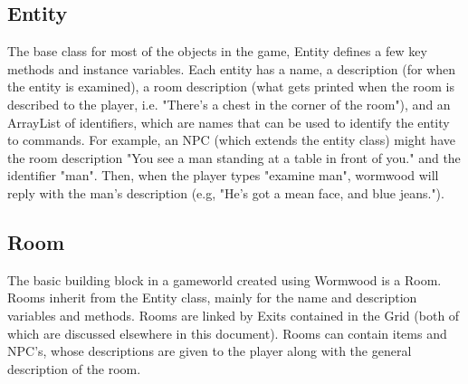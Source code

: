 \documentclass[12pt]{report}
\begin{document}
\subsection{Entity}
The base class for most of the objects in the game, Entity defines a few key methods and instance variables. Each entity has a name, a description (for when the entity is examined), a room description (what gets printed when the room is described to the player, i.e. "There's a chest in the corner of the room"), and an ArrayList of identifiers, which are names that can be used to identify the entity to commands. For example, an NPC (which extends the entity class) might have the room description "You see a man standing at a table in front of you." and the identifier "man". Then, when the player types "examine man", wormwood will reply with the man's description (e.g, "He's got a mean face, and blue jeans.").

\subsection{Room}
The basic building block in a gameworld created using Wormwood is a Room. Rooms inherit from the Entity class, mainly for the name and description variables and methods. Rooms are linked by Exits contained in the Grid (both of which are discussed elsewhere in this document). Rooms can contain items and NPC's, whose descriptions are given to the player along with the general description of the room.
\end{document}

